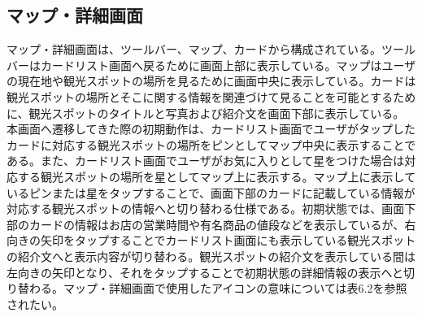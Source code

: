 \subsection{マップ・詳細画面}
マップ・詳細画面は、ツールバー、マップ、カードから構成されている。ツールバーはカードリスト画面へ戻るために画面上部に表示している。マップはユーザの現在地や観光スポットの場所を見るために画面中央に表示している。カードは観光スポットの場所とそこに関する情報を関連づけて見ることを可能とするために、観光スポットのタイトルと写真および紹介文を画面下部に表示している。\\
本画面へ遷移してきた際の初期動作は、カードリスト画面でユーザがタップしたカードに対応する観光スポットの場所をピンとしてマップ中央に表示することである。また、カードリスト画面でユーザがお気に入りとして星をつけた場合は対応する観光スポットの場所を星としてマップ上に表示する。マップ上に表示しているピンまたは星をタップすることで、画面下部のカードに記載している情報が対応する観光スポットの情報へと切り替わる仕様である。初期状態では、画面下部のカードの情報はお店の営業時間や有名商品の値段などを表示しているが、右向きの矢印をタップすることでカードリスト画面にも表示している観光スポットの紹介文へと表示内容が切り替わる。観光スポットの紹介文を表示している間は左向きの矢印となり、それをタップすることで初期状態の詳細情報の表示へと切り替わる。マップ・詳細画面で使用したアイコンの意味については表6.2を参照されたい。

